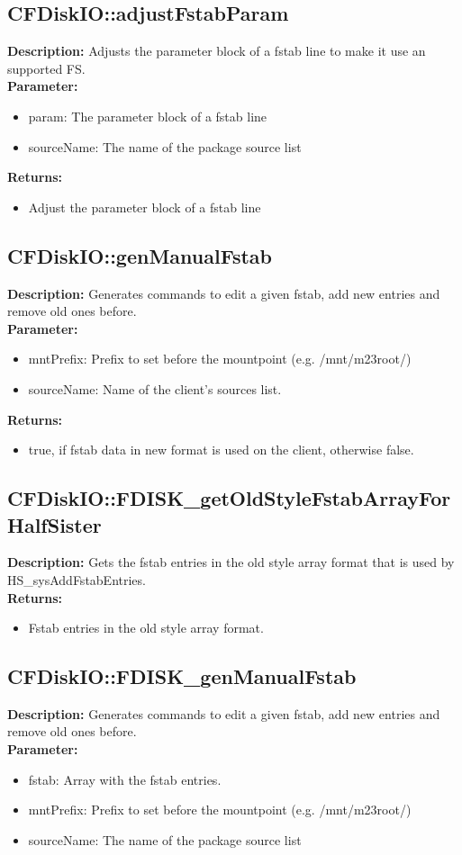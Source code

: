 \subsection{CFDiskIO::adjustFstabParam}
\textbf{Description:} Adjusts the parameter block of a fstab line to make it use an supported FS.\\
\textbf{Parameter:}
\begin{itemize}
\item param: The parameter block of a fstab line
\item sourceName: The name of the package source list
\end{itemize}
\textbf{Returns:}
\begin{itemize}
\item Adjust the parameter block of a fstab line
\end{itemize}

\subsection{CFDiskIO::genManualFstab}
\textbf{Description:} Generates commands to edit a given fstab, add new entries and remove old ones before.\\
\textbf{Parameter:}
\begin{itemize}
\item mntPrefix: Prefix to set before the mountpoint (e.g. /mnt/m23root/)
\item sourceName: Name of the client's sources list.
\end{itemize}
\textbf{Returns:}
\begin{itemize}
\item true, if fstab data in new format is used on the client, otherwise false.
\end{itemize}

\subsection{CFDiskIO::FDISK\_getOldStyleFstabArrayForHalfSister}
\textbf{Description:} Gets the fstab entries in the old style array format that is used by HS\_sysAddFstabEntries.\\
\textbf{Returns:}
\begin{itemize}
\item Fstab entries in the old style array format.
\end{itemize}

\subsection{CFDiskIO::FDISK\_genManualFstab}
\textbf{Description:} Generates commands to edit a given fstab, add new entries and remove old ones before.\\
\textbf{Parameter:}
\begin{itemize}
\item fstab: Array with the fstab entries.
\item mntPrefix: Prefix to set before the mountpoint (e.g. /mnt/m23root/)
\item sourceName: The name of the package source list
\end{itemize}

